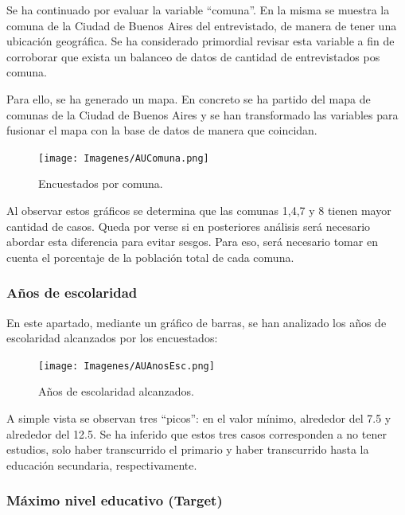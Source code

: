 \documentclass[a4paper]{article}
\begin{document}
            Se ha continuado por evaluar la variable ``comuna''. En la misma se muestra la comuna de la Ciudad de Buenos Aires del entrevistado, de manera de tener una ubicación geográfica. Se ha considerado primordial revisar esta variable a fin de corroborar que exista un balanceo de datos de cantidad de entrevistados pos comuna.
           
            Para ello, se ha generado un mapa. En concreto se ha partido del mapa de comunas de la Ciudad de Buenos Aires y se han transformado las variables para fusionar el mapa con la base de datos de manera que coincidan.
           
            \begin{figure}  [H]
                \centering
                \texttt{[image: Imagenes/AUComuna.png]}  
                \caption{Encuestados por comuna.}
                \label{AU comuna}
            \end{figure}
 
            Al observar estos gráficos se determina que las comunas 1,4,7 y 8 tienen mayor cantidad de casos. Queda por verse si en posteriores análisis será necesario abordar esta diferencia para evitar sesgos. Para eso, será necesario tomar en cuenta el porcentaje de la población total de cada comuna.
           

            \subsubsection{Años de escolaridad}
           
            En este apartado, mediante un gráfico de barras, se han analizado los años de escolaridad alcanzados por los encuestados:
           
            \begin{figure}[H]
                \centering
                \texttt{[image: Imagenes/AUAnosEsc.png]}
                \caption{Años de escolaridad alcanzados.}
                \label{AU years of scholarship}
            \end{figure}
           
            A simple vista se observan tres ``picos'': en el valor mínimo, alrededor del 7.5 y alrededor del 12.5. Se ha inferido que estos tres casos corresponden a no tener estudios, solo haber transcurrido el primario y haber transcurrido hasta la educación secundaria, respectivamente.
           
            \subsubsection{Máximo nivel educativo (Target)}
            
\end{document}
